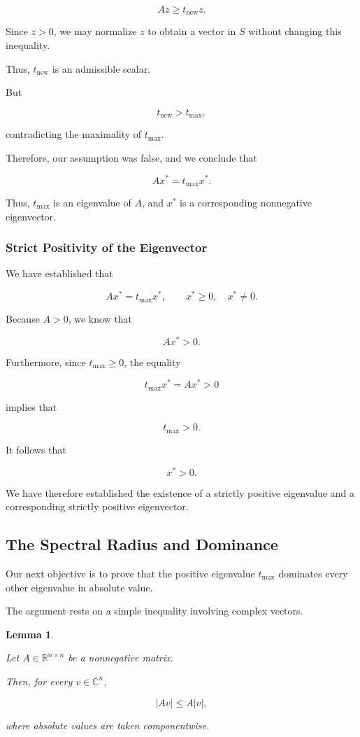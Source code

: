 \documentclass[11pt,a4paper]{article}
\newtheorem{lemma}[theorem]{Lemma}
\theoremstyle{definition}
\theoremstyle{remark}
\begin{document}
\[
Az\geq t_{\mathrm{new}}z.
\]

Since $z>0$, we may normalize
$z$ to obtain a vector in $S$
without changing this inequality.

Thus, $t_{\mathrm{new}}$
is an admissible scalar.

But

\[
t_{\mathrm{new}}>t_{\max},
\]

contradicting the maximality
of $t_{\max}$.

Therefore, our assumption
was false, and we conclude that

\begin{equation}
\boxed{
Ax^*=t_{\max}x^*.
}
\label{eq:perron_existence_result}
\end{equation}

Thus, $t_{\max}$ is an
eigenvalue of $A$, and
$x^*$ is a corresponding
nonnegative eigenvector.


\subsubsection{Strict Positivity of the Eigenvector}

We have established that

\[
Ax^*=t_{\max}x^*,
\qquad
x^*\geq0,\quad x^*\neq0.
\]

Because $A>0$, we know that

\[
Ax^*>0.
\]

Furthermore, since
$t_{\max}\geq0$, the equality

\[
t_{\max}x^*=Ax^*>0
\]

implies that

\[
t_{\max}>0.
\]

It follows that

\[
x^*>0.
\]

We have therefore established
the existence of a strictly
positive eigenvalue and a
corresponding strictly
positive eigenvector.


\subsection{The Spectral Radius and Dominance}

Our next objective is to prove
that the positive eigenvalue
$t_{\max}$ dominates every
other eigenvalue in absolute value.

The argument rests on a
simple inequality involving
complex vectors.


\begin{lemma}
\label{lem:absolute_value_inequality}

Let $A\in\mathbb{R}^{n\times n}$
be a nonnegative matrix.

Then, for every
$v\in\mathbb{C}^n$,

\begin{equation}
|Av|\leq A|v|,
\label{eq:perron_absolute_inequality}
\end{equation}

where absolute values are taken
componentwise.

\end{lemma}
\end{document}
